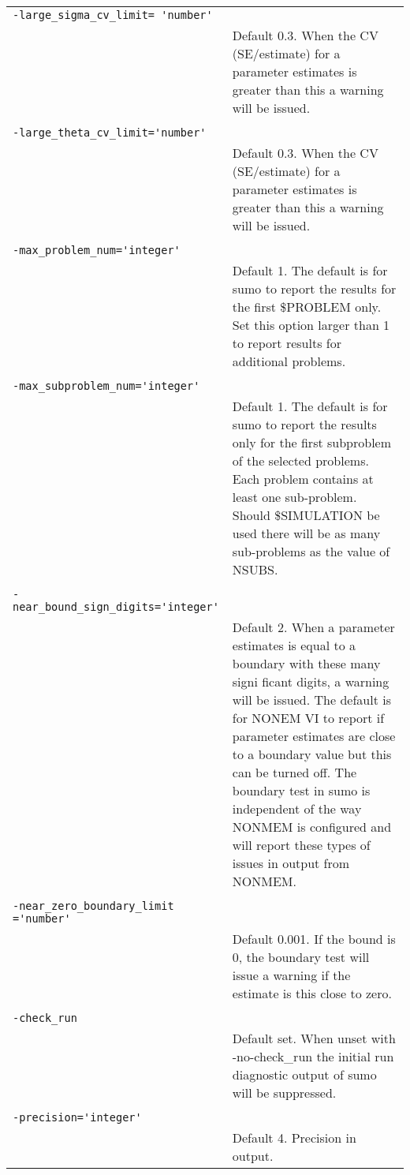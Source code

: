 \documentclass[a4paper,12pt]{article}
\begin{document}
\begin{longtable}{p{1in}p{4in}}
\verb|-large_sigma_cv_limit= 'number'| & \\
\nopagebreak
 & Default 0.3. When the CV (SE/estimate) for a parameter estimates is greater than this a warning will be issued. \\
\\
\verb|-large_theta_cv_limit='number'| & \\
\nopagebreak
 & Default 0.3. When the CV (SE/estimate) for a parameter estimates is greater than this a warning will be issued. \\
\\
\verb|-max_problem_num='integer'| & \\
\nopagebreak
 & Default 1. The default is for sumo to report the results for the first \$PROBLEM only. Set this option larger than 1 to report results for additional problems. \\
\\
\verb|-max_subproblem_num='integer'| & \\
\nopagebreak
 & Default 1. The default is for sumo to report the results only for the first subproblem of the selected problems. Each problem contains at least one sub-problem. Should \$SIMULATION be used there will be as many sub-problems as the value of NSUBS. \\
\\
\verb|-near_bound_sign_digits='integer'| & \\
\nopagebreak
 & Default 2. When a parameter estimates is equal to a boundary with these many signi ficant digits, a warning will be issued. The default is for NONEM VI to report if parameter estimates are close to a boundary value but this can be turned off. The boundary test in sumo is independent of the way NONMEM is configured and will report these types of issues in output from NONMEM. \\
\\
\verb|-near_zero_boundary_limit ='number'| & \\
\nopagebreak
 & Default 0.001. If the bound is 0, the boundary test will issue a warning if the estimate is this close to zero. \\
\\
\verb|-check_run| & \\
\nopagebreak
 & Default set. When unset with -no-check\_run the initial run diagnostic output of sumo will be suppressed. \\
\\
\verb|-precision='integer'| & \\
\nopagebreak
 & Default 4. Precision in output.  \\

\end{longtable}
\end{document}
